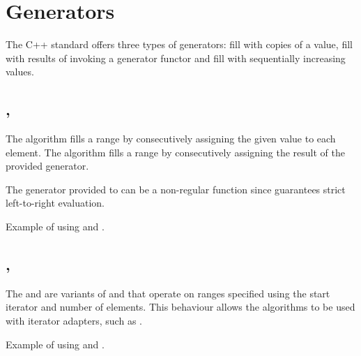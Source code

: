 \section{Generators}

The C++ standard offers three types of generators: fill with copies of a value, fill with results of invoking a generator functor and fill with sequentially increasing values.

\subsection{\texorpdfstring{, }{\texttt{std::fill}, \texttt{std::generate}}}

The  algorithm fills a range by consecutively assigning the given value to each element.
The  algorithm fills a range by consecutively assigning the result of the provided generator.



The generator provided to  can be a non-regular function since  guarantees strict left-to-right evaluation.

\begin{box-note}
\footnotesize Example of using  and .
\tcblower
{}
\end{box-note}

\subsection{\texorpdfstring{, }{\texttt{std::fill\_n}, \texttt{std::generate\_n}}}

The  and  are variants of  and  that operate on ranges specified using the start iterator and number of elements. This behaviour allows the algorithms to be used with iterator adapters, such as .


\begin{box-note}
\footnotesize Example of using  and .
\tcblower
{}
\end{box-note}



